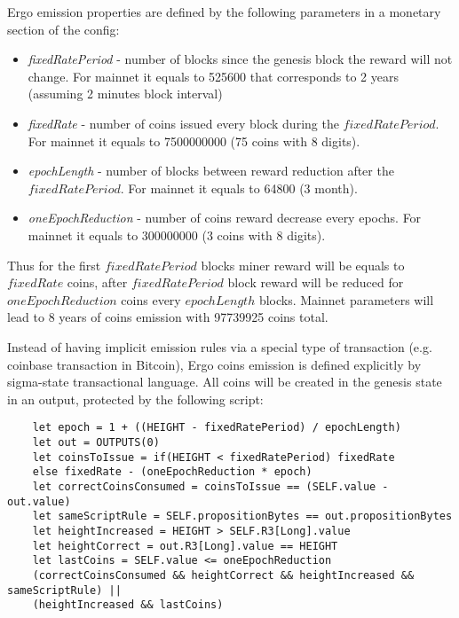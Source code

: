 Ergo emission properties are defined by the following parameters in a monetary section of the config:

\begin{itemize}
    \item{\em fixedRatePeriod } - number of blocks since the genesis block the reward will not change.
    For mainnet it equals to 525600 that corresponds to 2 years (assuming 2 minutes block interval)
    \item{\em fixedRate } - number of coins issued every block during the $fixedRatePeriod$.
    For mainnet it equals to 7500000000 (75 coins with 8 digits).
    \item{\em epochLength } - number of blocks between reward reduction after the $fixedRatePeriod$.
    For mainnet it equals to 64800 (3 month).
    \item{\em oneEpochReduction } - number of coins reward decrease every epochs.
    For mainnet it equals to 300000000 (3 coins with 8 digits).
\end{itemize}

Thus for the first $fixedRatePeriod$ blocks miner reward will be equals to $fixedRate$ \ergo{} coins,
after $fixedRatePeriod$ block reward will be reduced for $oneEpochReduction$ coins every $epochLength$ blocks.
Mainnet parameters will lead to 8 years of coins emission with 97739925 coins total.

Instead of having implicit emission rules via a special type of transaction (e.g. coinbase transaction in Bitcoin),
Ergo coins emission is defined explicitly by sigma-state transactional language.
All \ergo{} coins will be created in the genesis state in an output, protected by the following script:

\begin{verbatim}
    let epoch = 1 + ((HEIGHT - fixedRatePeriod) / epochLength)
    let out = OUTPUTS(0)
    let coinsToIssue = if(HEIGHT < fixedRatePeriod) fixedRate
    else fixedRate - (oneEpochReduction * epoch)
    let correctCoinsConsumed = coinsToIssue == (SELF.value - out.value)
    let sameScriptRule = SELF.propositionBytes == out.propositionBytes
    let heightIncreased = HEIGHT > SELF.R3[Long].value
    let heightCorrect = out.R3[Long].value == HEIGHT
    let lastCoins = SELF.value <= oneEpochReduction
    (correctCoinsConsumed && heightCorrect && heightIncreased && sameScriptRule) ||
    (heightIncreased && lastCoins)
\end{verbatim}

